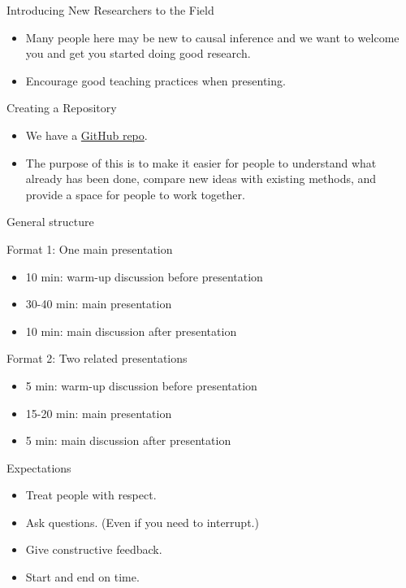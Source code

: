 \documentclass{beamer} %
\begin{document}
\begin{frame}{Introducing New Researchers to the Field}

    \begin{itemize}
        \item Many people here may be new to causal inference and we want to welcome
        you and get you started doing good research.
        \item Encourage good teaching practices when presenting.
    \end{itemize}
    
\end{frame}

\begin{frame}{Creating a Repository}

    \begin{itemize}
        \item We have a \href{https://github.com/calebleedy/ISU-Causal}{GitHub repo}. 
        \item The purpose of this is to make it easier for people to understand
        what already has been done, compare new ideas with existing methods, and
        provide a space for people to work together.
    \end{itemize}
\end{frame}

\begin{frame}{General structure}

Format 1: One main presentation
    \begin{itemize}
        \item 10 min: warm-up discussion before presentation 
        \item 30-40 min: main presentation
        \item 10 min: main discussion after presentation
    \end{itemize}

\vspace{0.3cm}

Format 2: Two related presentations
\begin{itemize}
    \item 5 min: warm-up discussion before presentation
    \item 15-20 min: main presentation
    \item 5 min: main discussion after presentation
\end{itemize}
\end{frame}


\begin{frame}{Expectations}

    \begin{itemize}
        \item<2-> Treat people with respect.
        \item<3-> Ask questions. (Even if you need to interrupt.)
        \item<4-> Give constructive feedback.
        \item<5-> Start and end on time.
    \end{itemize}
\end{frame}
\end{document}
